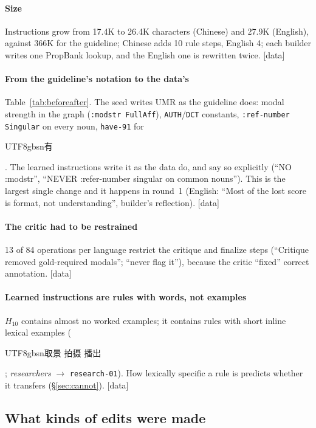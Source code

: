 \documentclass[11pt]{article}
\newcommand{\zh}[1]{\begin{CJK}{UTF8}{gbsn}#1\end{CJK}}
\newcommand{\stag}[2]{\textcolor{#1}{\textsf{\scriptsize[#2]}}}
\newcommand{\HAVE}{\stag{green!50!black}{data}\xspace}
\begin{document}
\paragraph{Size}
Instructions grow from 17.4K to 26.4K characters (Chinese) and 27.9K (English), against 366K for the guideline; Chinese adds 10 rule steps, English 4; each builder writes one PropBank lookup, and the English one is rewritten twice. \HAVE

\paragraph{From the guideline's notation to the data's}
Table~\ref{tab:beforeafter}. The seed writes UMR as the guideline does: modal strength in the graph (\texttt{:modstr FullAff}), \texttt{AUTH}/\texttt{DCT} constants, \texttt{:ref-number Singular} on every noun, \texttt{have-91} for \zh{有}. The learned instructions write it as the data do, and say so explicitly (``NO :modstr'', ``NEVER :refer-number singular on common nouns''). This is the largest single change and it happens in round~1 (English: ``Most of the lost score is format, not understanding'', builder's reflection). \HAVE

\paragraph{The critic had to be restrained}
13 of 84 operations per language restrict the critique and finalize steps (``Critique removed gold-required modals''; ``never flag it''), because the critic ``fixed'' correct annotation. \HAVE

\paragraph{Learned instructions are rules with words, not examples}
$H_{10}$ contains almost no worked examples; it contains rules with short inline lexical examples (\zh{取景 拍摄 播出}; \emph{researchers} $\rightarrow$ \texttt{research-01}). How lexically specific a rule is predicts whether it transfers (\S\ref{sec:cannot}). \HAVE

\subsection{What kinds of edits were made}
\end{document}
